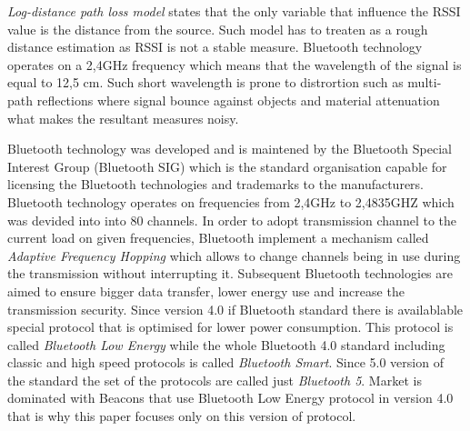 \documentclass[../main.tex]{subfiles}
\begin{document}
\textit{Log-distance path loss model} states that the only variable that influence the RSSI value is the distance from the source. Such model has to treaten as a rough distance estimation as RSSI is not a stable measure. Bluetooth technology operates on a 2,4GHz frequency which means that the wavelength of the signal is equal to 12,5 cm. Such short wavelength is prone to distrortion such as multi-path reflections where signal bounce against objects and material attenuation what makes the resultant measures noisy.

Bluetooth technology was developed and is maintened by the Bluetooth Special Interest Group (Bluetooth SIG) which is the standard organisation capable for licensing the Bluetooth technologies and trademarks to the manufacturers. Bluetooth technology operates on frequencies from 2,4GHz to 2,4835GHZ which was devided into into 80 channels. In order to adopt transmission channel to the current load on given frequencies, Bluetooth implement a mechanism called \textit{Adaptive Frequency Hopping} which allows to change channels being in use during the transmission without interrupting it. Subsequent Bluetooth technologies are aimed to ensure bigger data transfer, lower energy use and increase the transmission security. Since version 4.0 if Bluetooth standard there is availablable special protocol that is optimised for lower power consumption. This protocol is called \textit{Bluetooth Low Energy} while the whole Bluetooth 4.0 standard including classic and high speed protocols is called \textit{Bluetooth Smart}. Since 5.0 version of the standard the set of the protocols are called just \textit{Bluetooth 5}. Market is dominated with Beacons that use Bluetooth Low Energy protocol in version 4.0 that is why this paper focuses only on this version of protocol.
\end{document}
